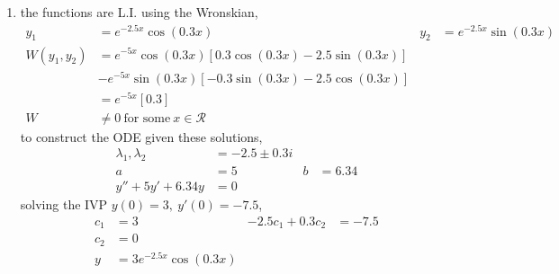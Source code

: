 \begin{enumerate}
    \item the functions are L.I. using the Wronskian,
          \begin{align}
              y_{1}           & = e^{-2.5x}\cos(0.3x)                               & y_{2} & = e^{-2.5x}\sin(0.3x) \\
              W(y_{1}, y_{2}) & = e^{-5x}\cos(0.3x)[0.3\cos(0.3x) - 2.5\sin(0.3x)]                                  \\
                              & - e^{-5x}\sin(0.3x)[-0.3\sin(0.3x) - 2.5\cos(0.3x)]                                 \\
                              & = e^{-5x}[0.3]                                                                      \\
              W               & \neq 0\ \text{for some}\ x \in \mathcal{R}
          \end{align}
          to construct the ODE given these solutions,
          \begin{align}
              \lambda_{1}, \lambda_{2} & = -2.5 \pm 0.3i              \\
              a                        & = 5             & b & = 6.34 \\
              y'' + 5y' + 6.34y        & = 0
          \end{align}
          solving the IVP $ y(0) = 3,\ y'(0) = -7.5 $,
          \begin{align}
              c_{1} & = 3                    & -2.5c_{1} + 0.3c_{2} & = -7.5 \\
              c_{2} & = 0                                                    \\
              y     & = 3e^{-2.5x}\cos(0.3x)
          \end{align}


\end{enumerate}
